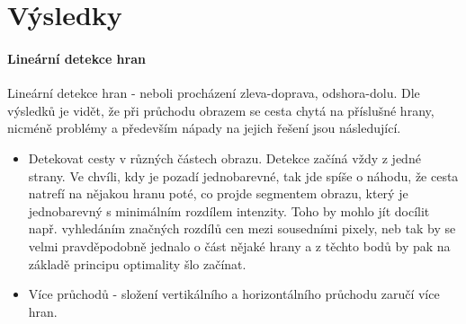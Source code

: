 \documentclass[12pt,a4paper,titlepage,final]{report}
\begin{document}
\section{Výsledky}

\paragraph{Lineární detekce hran}
Lineární detekce hran - neboli procházení zleva-doprava, odshora-dolu. Dle výsledků je vidět, že při průchodu obrazem se cesta chytá na příslušné hrany, nicméně problémy a především nápady na jejich řešení jsou následující.


\begin{itemize}
	\item Detekovat cesty v různých částech obrazu. Detekce začíná vždy z jedné strany. Ve chvíli, kdy je pozadí jednobarevné, tak jde spíše o náhodu, že cesta natrefí na nějakou hranu poté, co projde segmentem obrazu, který je jednobarevný s minimálním rozdílem intenzity. Toho by mohlo jít docílit např. vyhledáním značných rozdílů cen mezi sousedními pixely, neb tak by se velmi pravděpodobně jednalo o část nějaké hrany a z těchto bodů by pak na základě principu optimality šlo začínat.
	\item Více průchodů - složení vertikálního a horizontálního průchodu zaručí více hran.
\end{itemize}
\end{document}
